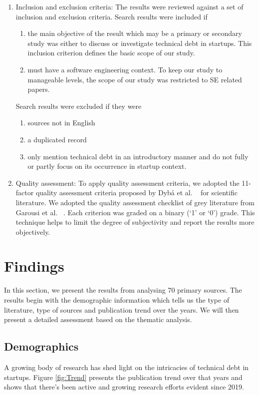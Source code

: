 \documentclass[manuscript]{acmart}
\begin{document}
\begin{enumerate}
\item Inclusion and exclusion criteria: The results were reviewed against a set of inclusion and exclusion criteria. Search results were included if 
\begin{enumerate}
\item the main objective of the result which may be a primary or secondary  study was either to discuss or investigate technical debt in startups. This inclusion criterion defines the basic scope of our study.
\item must have a software engineering context. To keep our study to manageable levels, the scope of our study was restricted to SE related papers.
\end{enumerate}
Search results were excluded if they were 
\begin{enumerate}
\item sources not in English
\item a duplicated record 
\item only mention technical debt in an introductory manner and do not fully or partly focus on its occurrence in startup context.
\end{enumerate}
\item Quality assessment: To apply quality assessment criteria, we adopted the 11-factor quality
assessment criteria proposed by Dybå et al. ~\cite{DYBA2008833} for scientific literature. We adopted the quality assessment checklist of grey literature from Garousi et al. ~\cite{GAROUSI2019101}.
Each criterion was graded on a binary (‘1’ or ‘0’) grade. This technique helps to limit the degree of subjectivity and report the results more objectively. 
\end{enumerate}

\section{Findings}\label{Sec:Results}
In this section, we present the results from analysing 70 primary sources. The results begin with the demographic information which tells us the type of literature, type of sources and publication trend over the years. We will then present a detailed assessment based on the thematic analysis.

\subsection{Demographics}
A growing body of research has shed light on the intricacies of technical debt in startups. Figure \ref{fig:Trend} presents the publication trend over that years and shows that there's been active and growing research efforts evident since 2019.
\end{document}
